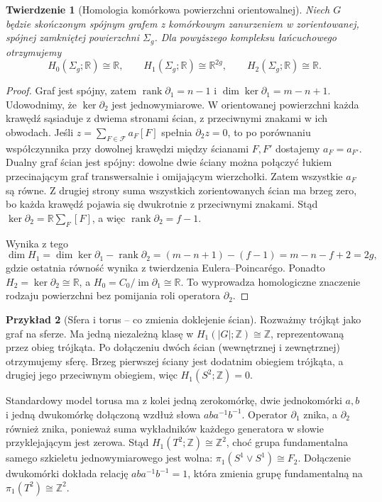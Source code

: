 \documentclass[11pt,a4paper]{report}
\numberwithin{equation}{section}
\theoremstyle{plain}
\newtheorem{twierdzenie}{Twierdzenie}[section]
\theoremstyle{definition}
\newtheorem{przyklad}[twierdzenie]{Przykład}
\theoremstyle{remark}
\begin{document}
\begin{twierdzenie}[Homologia komórkowa powierzchni orientowalnej]
\label{thm:tg-surface-homology}
Niech $G$ będzie skończonym spójnym grafem z komórkowym
zanurzeniem w zorientowanej, spójnej zamkniętej powierzchni
$\Sigma_g$. Dla powyższego kompleksu łańcuchowego
otrzymujemy
\[
H_0(\Sigma_g;\mathbb R)\cong\mathbb R,
\qquad H_1(\Sigma_g;\mathbb R)\cong\mathbb R^{2g},
\qquad H_2(\Sigma_g;\mathbb R)\cong\mathbb R.
\]
\end{twierdzenie}

\begin{proof}
Graf jest spójny, zatem $\operatorname{rank}\partial_1=n-1$
i $\dim\ker\partial_1=m-n+1$. Udowodnimy, że
$\ker\partial_2$ jest jednowymiarowe. W orientowanej
powierzchni każda krawędź sąsiaduje z dwiema stronami
ścian, z przeciwnymi znakami w ich obwodach. Jeśli
$z=\sum_{F\in\mathcal F}a_F[F]$ spełnia
$\partial_2z=0$, to po porównaniu współczynnika
przy dowolnej krawędzi między ścianami $F,F'$ dostajemy
$a_F=a_{F'}$. Dualny graf ścian jest spójny:
dowolne dwie ściany można połączyć łukiem przecinającym
graf transwersalnie i omijającym wierzchołki.
Zatem wszystkie $a_F$ są równe. Z drugiej strony
suma wszystkich zorientowanych ścian ma brzeg zero,
bo każda krawędź pojawia się dwukrotnie z przeciwnymi
znakami. Stąd
$\ker\partial_2=\mathbb R\sum_F[F]$, a więc
$\operatorname{rank}\partial_2=f-1$.

Wynika z tego
\[
\dim H_1=\dim\ker\partial_1-\operatorname{rank}\partial_2
=(m-n+1)-(f-1)=m-n-f+2=2g,
\]
gdzie ostatnia równość wynika z twierdzenia Eulera--Poincarégo.
Ponadto $H_2=\ker\partial_2\cong\mathbb R$,
a $H_0=C_0/\operatorname{im}\partial_1\cong\mathbb R$.
To wyprowadza homologiczne znaczenie rodzaju powierzchni
bez pomijania roli operatora $\partial_2$.
\end{proof}

\begin{przyklad}[Sfera i torus -- co zmienia doklejenie ścian]
Rozważmy trójkąt jako graf na sferze. Ma jedną niezależną
klasę w $H_1(|G|;\mathbb Z)\cong\mathbb Z$, reprezentowaną
przez obieg trójkąta. Po dołączeniu dwóch ścian
(wewnętrznej i zewnętrznej) otrzymujemy sferę.
Brzeg pierwszej ściany jest dodatnim obiegiem trójkąta,
a drugiej jego przeciwnym obiegiem, więc
$H_1(S^2;\mathbb Z)=0$.

Standardowy model torusa ma z kolei jedną zerokomórkę,
dwie jednokomórki $a,b$ i jedną dwukomórkę dołączoną
wzdłuż słowa $aba^{-1}b^{-1}$. Operator $\partial_1$ znika,
a $\partial_2$ również znika, ponieważ suma wykładników
każdego generatora w słowie przyklejającym jest zerowa.
Stąd $H_1(T^2;\mathbb Z)\cong\mathbb Z^2$, choć grupa
fundamentalna samego szkieletu jednowymiarowego jest
wolna: $\pi_1(S^1\vee S^1)\cong F_2$.
Dołączenie dwukomórki dokłada relację
$aba^{-1}b^{-1}=1$, która zmienia grupę fundamentalną
na $\pi_1(T^2)\cong\mathbb Z^2$.
\end{przyklad}
\end{document}
